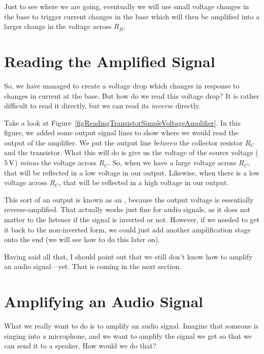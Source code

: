Just to see where we are going, eventually we will use small voltage changes in the base to trigger current changes in the base which will then be amplified into a larger change in the voltage across $R_B$.

\section{Reading the Amplified Signal}

So, we have managed to create a voltage drop which changes in response to changes in current at the base.
But how do we read this voltage drop?
It is rather difficult to read it directly, but we can read its \emph{inverse} directly.


Take a look at Figure~\ref{figReadingTransistorSimpleVoltageAmplifier}.
In this figure, we added some output signal lines to show where we would read the output of the amplifier.
We put the output line \emph{between} the collector resistor $R_C$ and the transistor.
What this will do is give us the voltage of the source voltage ($5\,\si{\volt}$) \emph{minus} the voltage across $R_C$.
So, when we have a large voltage across $R_C$, that will be reflected in a low voltage in our output.
Likewise, when there is a low voltage across $R_C$, that will be reflected in a high voltage in our output.

This sort of an output is known as an , because the output voltage is essentially reverse-amplified.
That actually works just fine for audio signals, as it does not matter to the listener if the signal is inverted or not.
However, if we needed to get it back to the non-inverted form, we could just add another amplification stage onto the end (we will see how to do this later on).

Having said all that, I should point out that we still don't know how to amplify an audio signal---yet.
That is coming in the next section.

\section{Amplifying an Audio Signal}

What we really want to do is to amplify an audio signal.
Imagine that someone is singing into a microphone, and we want to amplify the signal we get so that we can send it to a speaker.
How would we do that?

